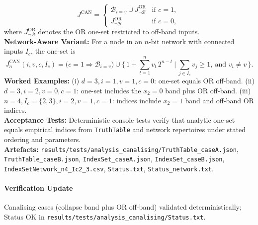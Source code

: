 \documentclass[11pt]{article}
\begin{document}
\[
J^{\mathrm{CAN}} = \begin{cases}
 \mathcal{B}_{i=v} \cup J^{\mathrm{OR}}_{\neg \mathcal{B}} & \text{if } c=1,\\
 J^{\mathrm{OR}}_{\neg \mathcal{B}} & \text{if } c=0,\
\end{cases}
\]
where \(J^{\mathrm{OR}}_{\neg \mathcal{B}}\) denotes the \(\mathrm{OR}\) one-set restricted to off-band inputs.\\
\textbf{Network-Aware Variant:} For a node in an \(n\)-bit network with connected inputs \(I_c\), the one-set is
\[
J^{\mathrm{CAN}}_{n}(i,v,c,I_c) = \Big( c=1 \Rightarrow \mathcal{B}_{i=v} \Big) \cup \Big\{\, 1 + \sum_{t=1}^{n} v_t\,2^{n-t} \ \Big| \ \sum_{j\in I_c} v_j \ge 1,\ \text{and } v_i \ne v\,\Big\}.
\]
\textbf{Worked Examples:} (i) \(d=3, i=1, v=1, c=0\): one-set equals \(\mathrm{OR}\) off-band. (ii) \(d=3, i=2, v=0, c=1\): one-set includes the \(x_2=0\) band plus \(\mathrm{OR}\) off-band. (iii) \(n=4, I_c=\{2,3\}, i=2, v=1, c=1\): indices include \(x_2=1\) band and off-band \(\mathrm{OR}\) indices.\\
\textbf{Acceptance Tests:} Deterministic console tests verify that analytic one-set equals empirical indices from \texttt{TruthTable} and network repertoires under stated ordering and parameters.\\
\textbf{Artefacts:} \texttt{results/tests/analysis\_canalising/TruthTable\_caseA.json}, \texttt{TruthTable\_caseB.json}, \texttt{IndexSet\_caseA.json}, \texttt{IndexSet\_caseB.json}, \texttt{IndexSetNetwork\_n4\_Ic2\_3.csv}, \texttt{Status.txt}, \texttt{Status\_network.txt}.
\paragraph{Verification Update} Canalising cases (collapse band plus OR off-band) validated deterministically; Status OK in \texttt{results/tests/analysis\_canalising/Status.txt}.
\end{document}
